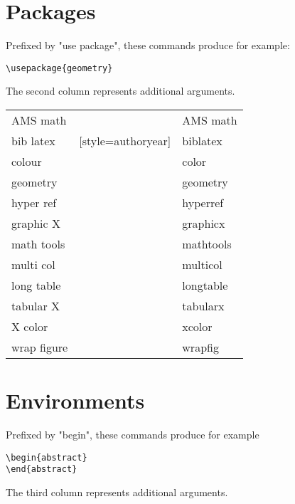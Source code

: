 \documentclass[12pt, a4paper]{article}
\begin{document}
\section{Packages}
Prefixed by "use package", these commands produce for example:

\begin{verbatim}
\usepackage{geometry}
\end{verbatim}

The second column represents additional arguments.

\begin{longtable}{lll}
\centering
AMS math & & AMS math \\
bib latex & [style=authoryear] & biblatex \\
colour & & color \\
geometry & & geometry \\
hyper ref & & hyperref \\
graphic X & & graphicx \\
math tools & & mathtools \\
multi col & & multicol \\
long table & & longtable \\
tabular X & & tabularx \\
X color & & xcolor \\
wrap figure & & wrapfig \\
\end{longtable}

\section{Environments}
Prefixed by "begin", these commands produce for example

\begin{verbatim}
\begin{abstract}
\end{abstract}
\end{verbatim}

The third column represents additional arguments.
\end{document}
